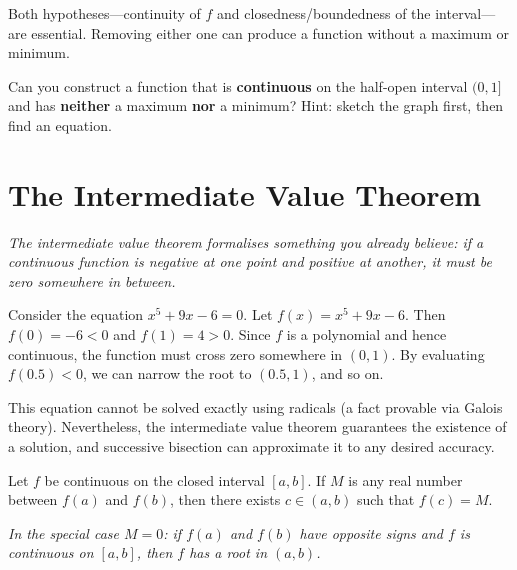\begin{remark}[Warning]
Both hypotheses---continuity of $f$ and closedness/boundedness of the interval---are essential.  Removing either one can produce a function without a maximum or minimum.
\end{remark}

\begin{remark}
Can you construct a function that is \textbf{continuous} on the half-open interval $(0, 1]$ and has \textbf{neither} a maximum \textbf{nor} a minimum?  Hint: sketch the graph first, then find an equation.
\end{remark}

\section{The Intermediate Value Theorem}
\label{sec:2.22}

\textit{The intermediate value theorem formalises something you already believe: if a continuous function is negative at one point and positive at another, it must be zero somewhere in between.}

\begin{example}
\label{ex:2-23}
Consider the equation $x^{5} + 9x - 6 = 0$.  Let $f(x) = x^{5} + 9x - 6$.  Then $f(0) = -6 < 0$ and $f(1) = 4 > 0$.  Since $f$ is a polynomial and hence continuous, the function must cross zero somewhere in $(0, 1)$.  By evaluating $f(0.5) < 0$, we can narrow the root to $(0.5, 1)$, and so on.
\end{example}

\begin{remark}
This equation cannot be solved exactly using radicals (a fact provable via Galois theory).  Nevertheless, the intermediate value theorem guarantees the existence of a solution, and successive bisection can approximate it to any desired accuracy.
\end{remark}

\begin{theorem}
\label{thm:2-16}
Let $f$ be continuous on the closed interval $[a, b]$.  If $M$ is any real number between $f(a)$ and $f(b)$, then there exists $c \in (a, b)$ such that $f(c) = M$.
\end{theorem}

\textit{In the special case $M = 0$: if $f(a)$ and $f(b)$ have opposite signs and $f$ is continuous on $[a, b]$, then $f$ has a root in $(a, b)$.}

